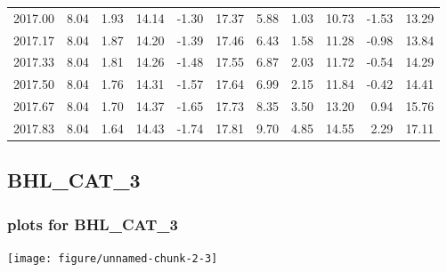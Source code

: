 \documentclass[10pt,a4paper]{article}\usepackage[]{graphicx}\usepackage[]{color}
\makeatletter
\def\maxwidth{ %
  \ifdim\Gin@nat@width>\linewidth
    \linewidth
  \else
    \Gin@nat@width
  \fi
}
\newcommand{\AaA}{\_}
\makeatother
\begin{document}
\begin{table}[ht]
\begin{tabular}{rrrrrrrrrrr}
  2017.00 & 8.04 & 1.93 & 14.14 & -1.30 & 17.37 & 5.88 & 1.03 & 10.73 & -1.53 & 13.29 \\ 
  2017.17 & 8.04 & 1.87 & 14.20 & -1.39 & 17.46 & 6.43 & 1.58 & 11.28 & -0.98 & 13.84 \\ 
  2017.33 & 8.04 & 1.81 & 14.26 & -1.48 & 17.55 & 6.87 & 2.03 & 11.72 & -0.54 & 14.29 \\ 
  2017.50 & 8.04 & 1.76 & 14.31 & -1.57 & 17.64 & 6.99 & 2.15 & 11.84 & -0.42 & 14.41 \\ 
  2017.67 & 8.04 & 1.70 & 14.37 & -1.65 & 17.73 & 8.35 & 3.50 & 13.20 & 0.94 & 15.76 \\ 
  2017.83 & 8.04 & 1.64 & 14.43 & -1.74 & 17.81 & 9.70 & 4.85 & 14.55 & 2.29 & 17.11 \\ 
   \hline
\end{tabular}
\end{table}

\newpage
\subsection{BHL\AaA CAT\AaA 3}
\subsubsection{plots for BHL\AaA CAT\AaA 3}

\texttt{[image: figure/unnamed-chunk-2-3]} 

\newpage
\end{document}
